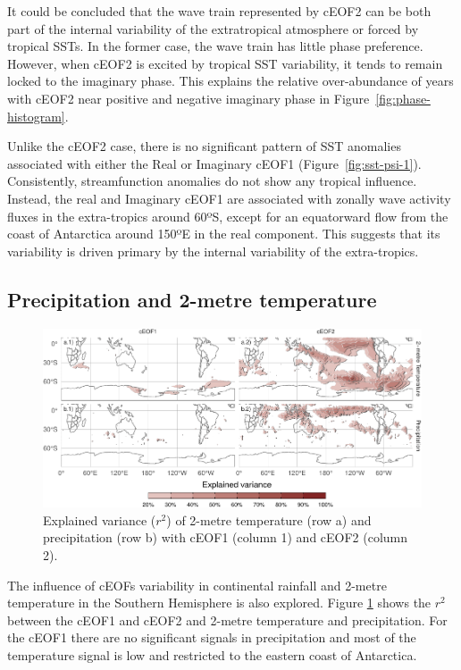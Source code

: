 \documentclass[smallextended]{svjour3}       %
\begin{document}
It could be concluded that the wave train represented by cEOF2 can be both part of the internal variability of the extratropical atmosphere or forced by tropical SSTs.
In the former case, the wave train has little phase preference.
However, when cEOF2 is excited by tropical SST variability, it tends to remain locked to the imaginary phase.
This explains the relative over-abundance of years with cEOF2 near positive and negative imaginary phase in Figure~\ref{fig:phase-histogram}.

Unlike the cEOF2 case, there is no significant pattern of SST anomalies associated with either the Real or Imaginary cEOF1 (Figure~\ref{fig:sst-psi-1}).
Consistently, streamfunction anomalies do not show any tropical influence.
Instead, the real and Imaginary cEOF1 are associated with zonally wave activity fluxes in the extra-tropics around 60ºS, except for an equatorward flow from the coast of Antarctica around 150ºE in the real component.
This suggests that its variability is driven primary by the internal variability of the extra-tropics.

\hypertarget{precipitation}{%
\subsection{Precipitation and 2-metre temperature}\label{precipitation}}

\begin{figure}
\centering
\includegraphics{../figures/pp-t2m-r2-1.pdf}
\caption{\label{fig:pp-t2m-r2}Explained variance (\(r^2\)) of 2-metre temperature (row a) and precipitation (row b) with cEOF1 (column 1) and cEOF2 (column 2).}
\end{figure}



The influence of cEOFs variability in continental rainfall and 2-metre temperature in the Southern Hemisphere is also explored.
Figure \ref{fig:pp-t2m-r2} shows the \(r^2\) between the cEOF1 and cEOF2 and 2-metre temperature and precipitation.
For the cEOF1 there are no significant signals in precipitation and most of the temperature signal is low and restricted to the eastern coast of Antarctica.
\end{document}
